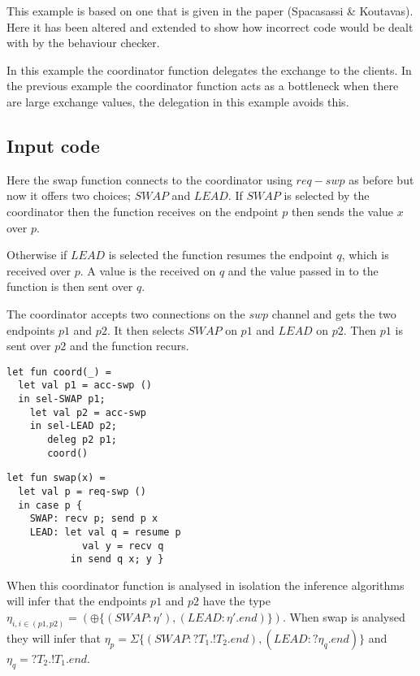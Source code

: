 This example is based on one that is given in the paper (Spacasassi \& Koutavas)\cite{paper1}. Here it has been altered and extended to show how incorrect code would be dealt with by the behaviour checker. 

In this example the coordinator function delegates the exchange to the clients. In the previous example the coordinator function acts as a bottleneck when there are large exchange values, the delegation in this example avoids this. 

\subsection{Input code}

Here the swap function connects to the coordinator using $req-swp$ as before but now it offers two choices; $SWAP$ and $LEAD$. If $SWAP$ is selected by the coordinator then the function receives on the endpoint $p$ then sends the value $x$ over $p$. 

Otherwise if $LEAD$ is selected the function resumes the endpoint $q$, which is received over $p$. A value is the received on $q$ and the value passed in to the function is then sent over $q$. 

The coordinator accepts two connections on the $swp$ channel and gets the two endpoints $p1$ and $p2$. It then selects $SWAP$ on $p1$ and $LEAD$ on $p2$. Then $p1$ is sent over $p2$ and the function recurs. 

\begin{minipage}{.45\textwidth}
\begin{lstlisting}[backgroundcolor=\color{white},numbers=none]
let fun coord(_) =
  let val p1 = acc-swp ()
  in sel-SWAP p1;
    let val p2 = acc-swp
    in sel-LEAD p2;
       deleg p2 p1;
       coord()
\end{lstlisting}
\end{minipage}
\hfill
\begin{minipage}{.45\textwidth}
\begin{lstlisting}[backgroundcolor=\color{white},numbers=none]
let fun swap(x) =
  let val p = req-swp ()
  in case p {
    SWAP: recv p; send p x
    LEAD: let val q = resume p
             val y = recv q
           in send q x; y }
\end{lstlisting}
\end{minipage}

When this coordinator function is analysed in isolation the inference algorithms will infer that the endpoints $p1$ and $p2$ have the type $\eta_{i, i \in (p1,p2)} = (\oplus \{(SWAP : \eta'), (LEAD : \eta'. end) \})$. When swap is analysed they will infer that $\eta_p = \Sigma\{(SWAP : ?T_1 .!T_2. end), (LEAD : ? \eta_q . end)\}$ and $\eta_q = ?T_2.!T_1.end$. 

